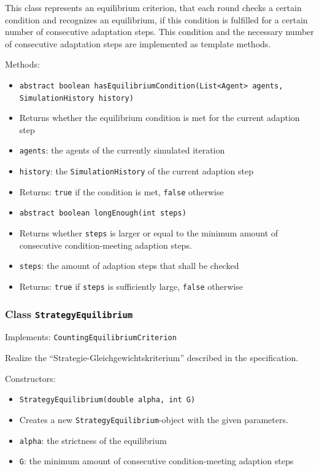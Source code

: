 \documentclass[parskip=full,11pt]{scrartcl}
\begin{document}
This class represents an equilibrium criterion, that each round checks a certain condition and recognizes an equilibrium, if this condition is fulfilled for a certain number of consecutive adaptation steps. This condition and the necessary number of consecutive adaptation steps are implemented as template methods.

Methods:
\begin{itemize}\itemsep -10pt
\item \texttt{abstract boolean hasEquilibriumCondition(List<Agent> agents, SimulationHistory history)}
\item[] Returns whether the equilibrium condition is met for the current adaption step
\item[] \texttt{agents}: the agents of the currently simulated iteration
\item[] \texttt{history}: the \texttt{SimulationHistory} of the current adaption step
\item[] Returns: \texttt{true} if the condition is met, \texttt{false} otherwise

\item \texttt{abstract boolean longEnough(int steps)}
\item[] Returns whether \texttt{steps} is larger or equal to the minimum amount of consecutive condition-meeting adaption steps.
\item[] \texttt{steps}: the amount of adaption steps that shall be checked
\item[] Returns: \texttt{true} if \texttt{steps} is sufficiently large, \texttt{false} otherwise
\end{itemize}

\subsubsection{Class \texttt{StrategyEquilibrium}}
Implements: \texttt{CountingEquilibriumCriterion}

Realize the \enquote{Strategie-Gleichgewichtskriterium} described in the specification.

Constructors:
\begin{itemize}\itemsep -10pt
\item \texttt{StrategyEquilibrium(double alpha, int G)}
\item[] Creates a new \texttt{StrategyEquilibrium}-object with the given parameters.
\item[] \texttt{alpha}: the strictness of the equilibrium
\item[] \texttt{G}: the minimum amount of consecutive condition-meeting adaption steps
\end{itemize}
\end{document}
